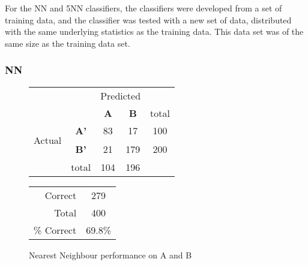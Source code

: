 For the NN and 5NN classifiers, the classifiers were developed from a set of training data, and the classifier was tested with a new set of data, distributed with the same underlying statistics as the training data. This data set was of the same size as the training data set.

\subsubsection{NN}
\begin{figure}[!ht]
\begin{minipage}[b]{0.5\linewidth}
\centering
	\begin{tabular}{ccc|c|c}
	 & &\multicolumn{2}{c}{Predicted} &\\
	  & & \bf{A} &  \bf{B} & total \\
	 \cline{3-5}
	 \multirow{2}{*}{\begin{sideways}Actual\end{sideways}} & \bf{A'}& 83 & 17 & 100 \\
	 \cline{3-5}
	 & \bf{B'}& 21 & 179 & 200 \\
	  \cline{3-5}
	 &total&104&196&\\
	\end{tabular}
\end{minipage}
\hspace{0.5cm}
\begin{minipage}[b]{0.5\linewidth}
	\begin{tabular}{r|c}
	\hline
	Correct& 279\\
	Total& 400\\
	\hline
	\% Correct& 69.8\%\\
	\hline
	\end{tabular}
\end{minipage}
\vspace{1mm}
\caption{Nearest Neighbour performance on A and B}
\end{figure}


